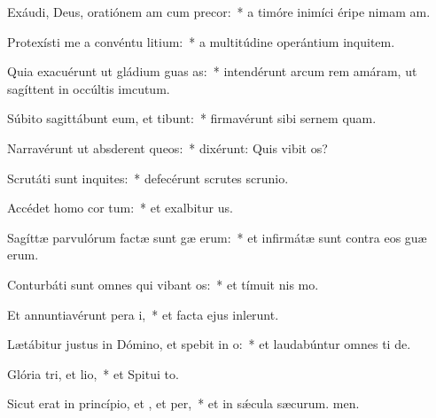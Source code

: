 \item Exáudi, Deus, oratiónem am cum precor:~* a timóre inimíci éripe nimam am.
\item Protexísti me a convéntu litium:~* a multitúdine operántium inquitem.
\item Quia exacuérunt ut gládium guas as:~* intendérunt arcum rem amáram, ut sagíttent in occúltis imcutum.
\item Súbito sagittábunt eum, et  tibunt:~* firmavérunt sibi sernem quam.
\item Narravérunt ut absderent queos:~* dixérunt: Quis vibit os?
\item Scrutáti sunt inquites:~* defecérunt scrutes scrunio.
\item Accédet homo  cor tum:~* et exalbitur us.
\item Sagíttæ parvulórum factæ sunt gæ erum:~* et infirmátæ sunt contra eos guæ erum.
\item Conturbáti sunt omnes qui vibant os:~* et tímuit nis mo.
\item Et annuntiavérunt pera i,~* et facta ejus inlerunt.
\item Lætábitur justus in Dómino, et spebit in o:~* et laudabúntur omnes ti de.
\item Glória tri, et lio,~* et Spitui to.
\item Sicut erat in princípio, et , et per,~* et in sǽcula sæcurum. men.
